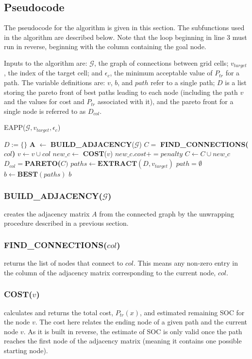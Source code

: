 \documentclass[journal]{IEEEtran}
\begin{document}
\subsection{Pseudocode}
The pseudocode for the algorithm is given in this section. The subfunctions used in the algorithm are described below. 
Note that the loop beginning in line 3 must run in reverse, beginning with the column containing the goal node.

Inputs to the algorithm are: $\mathcal{G}$, the graph of connections between grid cells; $v_{target}$, the index of the target cell; and $\epsilon_c$, the minimum acceptable value of $P_{tr}$ for a path. The variable definitions are: $v$, $b$, and $path$ refer to a single path; $D$ is a list storing the pareto front of best paths leading to each node (including the path $v$ and the values for cost and $P_{tr}$ associated with it), and the pareto front for a single node is referred to as $D_{col}$.
\bigskip

\textsc{EAPP}($\mathcal{G}, v_{target}, \epsilon_c$)
\begin{algorithmic}[1]
\STATE $D:=\{\}$ 
\STATE \textbf{A} $\leftarrow$ \textbf{BUILD\_ADJACENCY}($\mathcal{G}$)
\STATE $C =$ \textbf{FIND\_CONNECTIONS($col$)}
\STATE $v  \leftarrow v \cup col$ 
\STATE $new\_c \leftarrow$ \textbf{COST}($v$)
\STATE $new\_c.cost += penalty $ 
\ENDIF
\STATE $C \leftarrow C \cup new\_c$ 
\STATE $D_{col} = $\textbf{PARETO($C)$}
\ENDFOR
\ENDFOR
\STATE $paths \leftarrow \textbf{EXTRACT}(D, v_{target})$
\STATE $path = \emptyset$
\ENDIF
\ENDFOR
\STATE $b \leftarrow \textbf{BEST}(paths)$
\RETURN $b$
\end{algorithmic}

\subsubsection{BUILD\_ADJACENCY($\mathcal{G}$)} creates the adjacency matrix $A$ from the connected graph by the unwrapping procedure described in a previous section.
\subsubsection{FIND\_CONNECTIONS($col$)} returns the list of nodes that connect to $col$. This means any non-zero entry in the column of the adjacency matrix corresponding to the current node, $col$.
\subsubsection{COST($v$)} calculates and returns the total cost, $P_{tr}(x)$, and estimated remaining SOC for the node $v$. The cost here relates the ending node of a given path and the current node $v$. As it is built in reverse, the estimate of SOC is only valid once the path reaches the first node of the adjacency matrix (meaning it contains one possible starting node).
\end{document}
